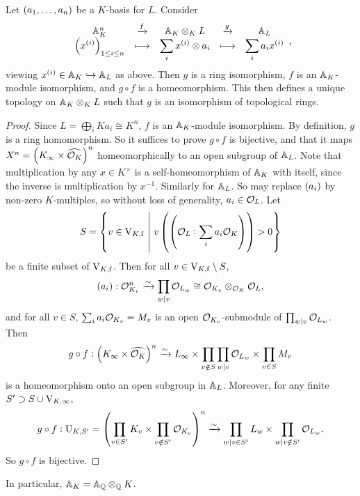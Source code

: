\begin{proposition}
\label{prop:5.3}
Let $ \br{a_1, \dots, a_n} $ be a $ K $-basis for $ L $. Consider
$$
\begin{array}{ccccc}
\AA_K^n & \xrightarrow{f} & \AA_K \otimes_K L & \xrightarrow{g} & \AA_L \\
\displaystyle\br{x^{\br{i}}}_{1 \le i \le n} & \longmapsto & \displaystyle\sum_i x^{\br{i}} \otimes a_i & \longmapsto & \displaystyle\sum_i a_ix^{\br{i}}
\end{array},
$$
viewing $ x^{\br{i}} \in \AA_K \hookrightarrow \AA_L $ as above. Then $ g $ is a ring isomorphism, $ f $ is an $ \AA_K $-module isomorphism, and $ g \circ f $ is a homeomorphism. This then defines a unique topology on $ \AA_K \otimes_K L $ such that $ g $ is an isomorphism of topological rings.
\end{proposition}

\begin{proof}
Since $ L = \bigoplus_i Ka_i \cong K^n $, $ f $ is an $ \AA_K $-module isomorphism. By definition, $ g $ is a ring homomorphism. So it suffices to prove $ g \circ f $ is bijective, and that it maps $ X^n = \br{K_\infty \times \widehat{\OOO_K}}^n $ homeomorphically to an open subgroup of $ \AA_L $. Note that multiplication by any $ x \in K^\times $ is a self-homeomorphism of $ \AA_K $ with itself, since the inverse is multiplication by $ x^{-1} $. Similarly for $ \AA_L $. So may replace $ \br{a_i} $ by non-zero $ K $-multiples, so without loss of generality, $ a_i \in \OOO_L $. Let
$$ S = \cbr{v \in \V_{K, \f} \st v\br{\br{\OOO_L : \sum_i a_i\OOO_K}} > 0} $$
be a finite subset of $ \V_{K, \f} $. Then for all $ v \in \V_{K, \f} \setminus S $,
$$ \br{a_i} : \OOO_{K_v}^n \xrightarrow{\sim} \prod_{w \mid v} \OOO_{L_w} \cong \OOO_{K_v} \otimes_{\OOO_K} \OOO_L, $$
and for all $ v \in S $, $ \sum_i a_i\OOO_{K_v} = M_v $ is an open $ \OOO_{K_v} $-submodule of $ \prod_{w \mid v} \OOO_{L_w} $. Then
$$ g \circ f : \br{K_\infty \times \widehat{\OOO_K}}^n \xrightarrow{\sim} L_\infty \times \prod_{v \notin S} \prod_{w \mid v} \OOO_{L_w} \times \prod_{v \in S} M_v $$
is a homeomorphism onto an open subgroup in $ \AA_L $. Moreover, for any finite $ S' \supset S \cup \V_{K, \infty} $,
$$ g \circ f : \U_{K, S'} = \br{\prod_{v \in S'} K_v \times \prod_{v \notin S'} \OOO_{K_v}}^n \xrightarrow{\sim} \prod_{w \mid v \in S'} L_w \times \prod_{w \mid v \notin S'} \OOO_{L_w}. $$
So $ g \circ f $ is bijective.
\end{proof}

In particular, $ \AA_K = \AA_\QQ \otimes_\QQ K $.


